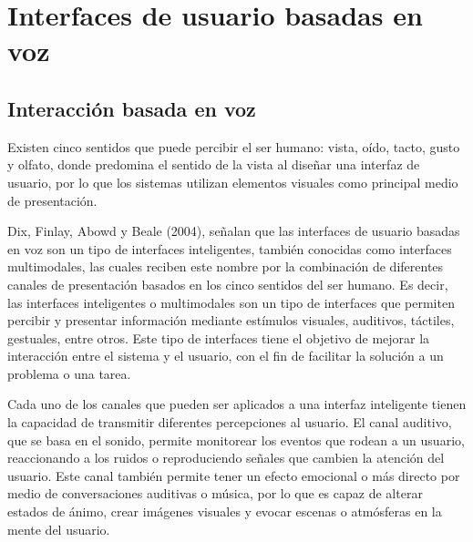 
\section{Interfaces de usuario basadas en voz}
\label{InterfacesUsuarioBasadasVozCap3}


\subsection{Interacción basada en voz}
\label{InteraccionBasadaVozCap3}

Existen cinco sentidos que puede percibir el ser humano: vista, oído, tacto, gusto y olfato, donde predomina el sentido de la vista al diseñar una interfaz de usuario, por lo que los sistemas utilizan elementos visuales como principal medio de presentación.

Dix, Finlay, Abowd y Beale (2004), señalan que las interfaces de usuario basadas en voz son un tipo de interfaces inteligentes, también conocidas como interfaces multimodales, las cuales reciben este nombre por la combinación de diferentes canales de presentación basados en los cinco sentidos del ser humano. Es decir, las interfaces inteligentes o multimodales son un tipo de interfaces que permiten percibir y presentar información mediante estímulos visuales, auditivos, táctiles, gestuales, entre otros. Este tipo de interfaces tiene el objetivo de mejorar la interacción entre el sistema y el usuario, con el fin de facilitar la solución a un problema o una tarea.

Cada uno de los canales que pueden ser aplicados a una interfaz inteligente tienen la capacidad de transmitir diferentes percepciones al usuario. El canal auditivo, que se basa en el sonido, permite monitorear los eventos que rodean a un usuario, reaccionando a los ruidos o reproduciendo señales que cambien la atención del usuario. Este canal también permite tener un efecto emocional o más directo por medio de conversaciones auditivas o música, por lo que es capaz de alterar estados de ánimo, crear imágenes visuales y evocar escenas o atmósferas en la mente del usuario.

